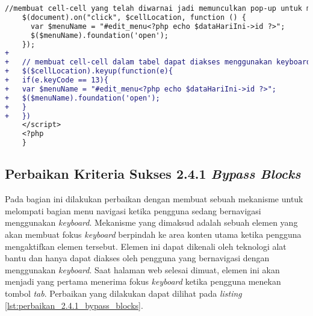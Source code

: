 \begin{itemize}
\begin{lstlisting}[frame=single, label={lst:perbaikan_2.1.1_keyboard_entri_jadwal_dosen}, language=diff, caption=Perbaikan Kriteria Sukses 2.1.1 pada Halaman Entri Jadwal Dosen]
    //membuat cell-cell yang telah diwarnai jadi memunculkan pop-up untuk mengedit jadwal ketika diklik oleh mouse
    $(document).on("click", $cellLocation, function () {
      var $menuName = "#edit_menu<?php echo $dataHariIni->id ?>";
      $($menuName).foundation('open');
    });
+
+   // membuat cell-cell dalam tabel dapat diakses menggunakan keyboard
+   $($cellLocation).keyup(function(e){
+   if(e.keyCode == 13){
+   var $menuName = "#edit_menu<?php echo $dataHariIni->id ?>";
+   $($menuName).foundation('open');
+   }
+   })
    </script>
    <?php
    }
\end{lstlisting}
\end{itemize}

\subsection{Perbaikan Kriteria Sukses 2.4.1 \textit{Bypass Blocks}}
\label{subsec:perbaikan_kriteria_sukses_2.4.1}
Pada bagian ini dilakukan perbaikan dengan membuat sebuah mekanisme untuk melompati bagian menu navigasi ketika pengguna sedang bernavigasi menggunakan \textit{keyboard}. Mekanisme yang dimaksud adalah sebuah elemen yang akan membuat fokus \textit{keyboard} berpindah ke area konten utama ketika pengguna mengaktifkan elemen tersebut. Elemen ini dapat dikenali oleh teknologi alat bantu dan hanya dapat diakses oleh pengguna yang bernavigasi dengan menggunakan \textit{keyboard}. Saat halaman web selesai dimuat, elemen ini akan menjadi yang pertama menerima fokus \textit{keyboard} ketika pengguna menekan tombol \textit{tab}. Perbaikan yang dilakukan dapat dilihat pada \textit{listing} \ref{lst:perbaikan_2.4.1_bypass_blocks}.
